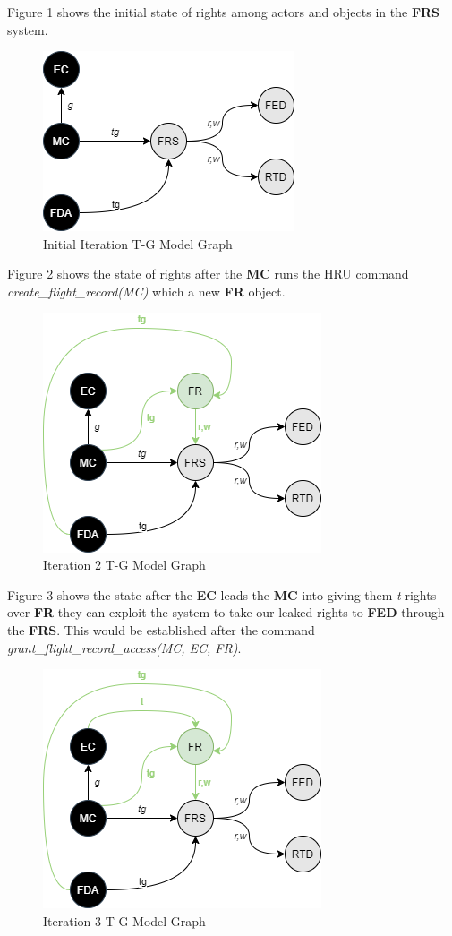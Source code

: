 \documentclass[10pt,journal,compsoc]{IEEEtran}
\begin{document}
Figure 1 shows the initial state of rights among actors and objects in the \textbf{FRS} system.

\begin{figure}[t]
  \caption{Initial Iteration T-G Model Graph} 
  \includegraphics[scale=0.7]{TGModel1.png}
\end{figure}

Figure 2 shows the state of rights after the \textbf{MC} runs the HRU command \textit{create\_flight\_record(MC)} which a new \textbf{FR} object. 

\begin{figure}[t]
  \caption{Iteration 2 T-G Model Graph} 
  \includegraphics[scale=0.7]{TGModel2.png}
\end{figure}

Figure 3 shows the state after the \textbf{EC} leads the \textbf{MC} into giving them \textit{t} rights over \textbf{FR} they can exploit the system to take our leaked rights to \textbf{FED} through the \textbf{FRS}. 
This would be established after the command \textit{grant\_flight\_record\_access(MC, EC, FR)}.

\begin{figure}[t]
  \caption{Iteration 3 T-G Model Graph} 
  \includegraphics[scale=0.7]{TGModel3.png}
\end{figure}
\end{document}
